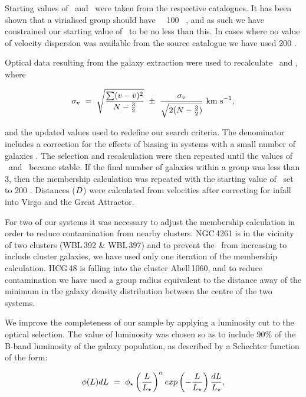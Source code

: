 \documentclass[usenatbib]{mn2e}
\begin{document}
Starting values of \vel\ and \sigmav\ were taken from the respective catalogues.
It has been shown that a virialised group should have \sigmav\ \gtsim\ 100 \kmps\
\citep{mamon94}, and as such we have constrained our starting value of \sigmav\
to be no less than this.  In cases where no value of velocity dispersion was
available from the source catalogue we have used 200 \kmps.

Optical data resulting from the galaxy extraction were used to recalculate \vel\
and \sigmav, where 

\begin{equation}
\sigma_{\mathrm{v}} ~ = ~ \sqrt{\frac{\sum(v-\bar{v})^{2}}{N-\frac{3}{2}}} ~ \pm ~ \frac{\sigma_{\mathrm{v}}}{\sqrt{2(N-\frac{3}{2})}} ~ \mbox{km~s}^{-1},
\label{eqn_sigmav}
\end{equation}

\noindent and the updated values used to redefine our search criteria.  The
denominator includes a correction for the effects of biasing in systems with a
small number of galaxies \citep{helsdon04b}.  The selection and recalculation
were then repeated until the values of \vel\ and \sigmav\ became stable.  If
the final number of galaxies within a group was less than 3, then the membership
calculation was repeated with the starting value of \sigmav\ set to 200 \kmps.
Distances ($D$) were calculated from velocities after correcting for infall into
Virgo and the Great Attractor.

For two of our systems it was necessary to adjust the membership calculation in
order to reduce contamination from nearby clusters.  NGC\,4261 is in the vicinity
of two clusters (WBL\,392 \& WBL\,397) and to prevent the \sigmav\ from increasing to
include cluster galaxies, we have used only one iteration of the membership
calculation.  HCG\,48 is falling into the cluster Abell\,1060, and to reduce
contamination we have used a group radius equivalent to the distance away of the
minimum in the galaxy density distribution between the centre of the two systems.

We improve the completeness of our sample by applying a luminosity cut to the
optical selection.  The value of luminosity was chosen so as to include 90\% of
the B-band luminosity of the galaxy population, as described by a
Schechter function of the form:

\begin{equation}
\phi(L)dL ~ = ~ \phi_{\star} \left( \frac{L}{L_{\star}} \right)^{\alpha} exp \left( - \frac{L}{L_{\star}} \right) \frac{dL}{L_{\star}},
\label{eqn_lumfun}
\end{equation}
\end{document}
